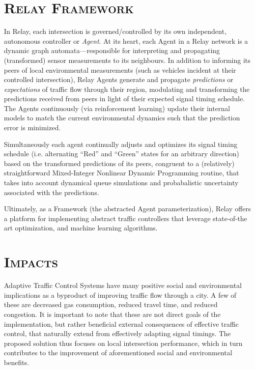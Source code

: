 \documentclass[a4paper,10pt]{article}
\begin{document}
\begin{multicols}{2}
\section{\textsc{Relay Framework}}

In Relay, each intersection is governed/controlled by its own independent, autonomous controller or \emph{Agent}.
At its heart, each Agent in a Relay network is a dynamic graph automata---responsible for interpreting and propagating (transformed) sensor measurements to its neighbours.
In addition to informing its peers of local environmental measurements (such as vehicles incident at their controlled intersection), Relay Agents generate and propagate \emph{predictions} or \emph{expectations} of traffic flow through their region, modulating and transforming the predictions received from peers in light of their expected signal timing schedule.
The Agents continuously (via reinforcement learning) update their internal models to match the current environmental dynamics such that the prediction error is minimized.

Simultaneously each agent continually adjusts and optimizes its signal timing schedule (i.e. alternating ``Red'' and ``Green'' states for an arbitrary direction) based on the transformed predictions of its peers, congruent to a (relatively) straightforward Mixed-Integer Nonlinear Dynamic Programming routine, that takes into account dynamical queue simulations and probabalistic uncertainty associated with the predictions.

Ultimately, as a Framework (the abstracted Agent parameterization), Relay offers a platform for implementing abstract traffic controllers that leverage state-of-the art optimization, and machine learning algorithms.


\section{\textsc{Impacts}}
Adaptive Traffic Control Systems have many positive social and environmental implications as a byproduct of improving traffic flow through a city.
A few of these are decreased gas consumption, reduced travel time, and reduced congestion.
It is important to note that these are not direct goals of the implementation, but rather beneficial external consequences of effective traffic control, that naturally extend from effectively adapting signal timings.
The proposed solution thus focuses on local intersection performance, which in turn contributes to the improvement of aforementioned social and environmental benefits.


\end{multicols}
\end{document}
